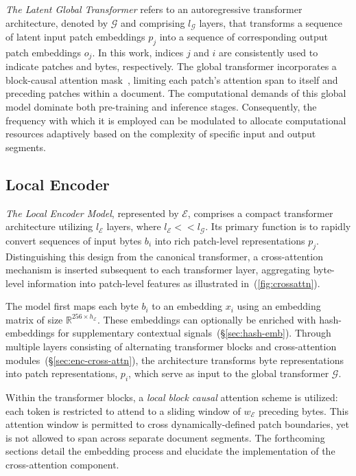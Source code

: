 \textit{The Latent Global Transformer} refers to an autoregressive transformer architecture, denoted by $\mathcal{G}$ and comprising $l_{\mathcal{G}}$ layers, that transforms a sequence of latent input patch embeddings $p_j$ into a sequence of corresponding output patch embeddings $o_j$. In this work, indices $j$ and $i$ are consistently used to indicate patches and bytes, respectively. The global transformer incorporates a block-causal attention mask~\citep{dubey2024llama}, limiting each patch's attention span to itself and preceding patches within a document. The computational demands of this global model dominate both pre-training and inference stages. Consequently, the frequency with which it is employed can be modulated to allocate computational resources adaptively based on the complexity of specific input and output segments.

\subsection{Local Encoder}
\label{section:local}

\textit{The Local Encoder Model}, represented by $\mathcal{E}$, comprises a compact transformer architecture utilizing $l_{\mathcal{E}}$ layers, where $l_{\mathcal{E}} << l_{\mathcal{G}}$. Its primary function is to rapidly convert sequences of input bytes $b_i$ into rich patch-level representations $p_j$. Distinguishing this design from the canonical transformer, a cross-attention mechanism is inserted subsequent to each transformer layer, aggregating byte-level information into patch-level features as illustrated in~(\autoref{fig:crossattn}).

The model first maps each byte $b_i$ to an embedding $x_i$ using an embedding matrix of size $\mathbb{R}^{256 \times h_{\mathcal{E}}}$. These embeddings can optionally be enriched with hash-embeddings for supplementary contextual signals~(\S\ref{sec:hash-emb}). Through multiple layers consisting of alternating transformer blocks and cross-attention modules~(\S\ref{sec:enc-cross-attn}), the architecture transforms byte representations into patch representations, $p_i$, which serve as input to the global transformer $\mathcal{G}$.

Within the transformer blocks, a \textit{local block causal} attention scheme is utilized: each token is restricted to attend to a sliding window of $w_{\mathcal{E}}$ preceding bytes. This attention window is permitted to cross dynamically-defined patch boundaries, yet is not allowed to span across separate document segments. The forthcoming sections detail the embedding process and elucidate the implementation of the cross-attention component.

